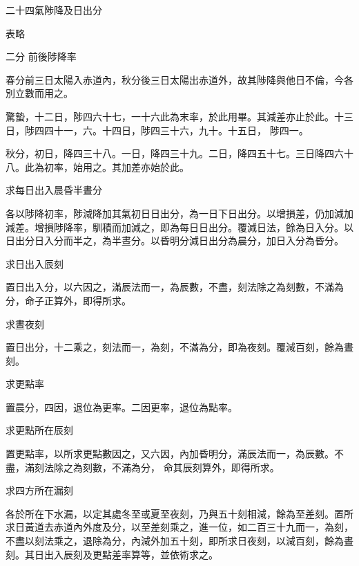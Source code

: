 \begin{pinyinscope}
 二十四氣陟降及日出分



 表略



 二分
 前後陟降率



 春分前三日太陽入赤道內，秋分後三日太陽出赤道外，故其陟降與他日不倫，今各別立數而用之。



 驚蟄，十二日，陟四六十七，一十六此為末率，於此用畢。其減差亦止於此。十三日，陟四四十一，六。十四日，陟四三十六，九十。十五日，
 陟四一。



 秋分，初日，降四三十八。一日，降四三十九。二日，降四五十七。三日降四六十八。此為初率，始用之。其加差亦始於此。



 求每日出入晨昏半晝分



 各以陟降初率，陟減降加其氣初日日出分，為一日下日出分。以增損差，仍加減加減差。增損陟降率，馴積而加減之，即為每日日出分。覆減日法，餘為日入分。以日出分日入分而半之，為半晝分。以昏明分減日出分為晨分，加日入分為昏分。



 求日出入辰刻



 置日出入分，以六因之，滿辰法而一，為辰數，不盡，刻法除之為刻數，不滿為分，命子正算外，即得所求。



 求晝夜刻



 置日出分，十二乘之，刻法而一，為刻，不滿為分，即為夜刻。覆減百刻，餘為晝刻。



 求更點率



 置晨分，四因，退位為更率。二因更率，退位為點率。



 求更點所在辰刻



 置更點率，以所求更點數因之，又六因，內加昏明分，滿辰法而一，為辰數。不盡，滿刻法除之為刻數，不滿為分，
 命其辰刻算外，即得所求。



 求四方所在漏刻



 各於所在下水漏，以定其處冬至或夏至夜刻，乃與五十刻相減，餘為至差刻。置所求日黃道去赤道內外度及分，以至差刻乘之，進一位，如二百三十九而一，為刻，不盡以刻法乘之，退除為分，內減外加五十刻，即所求日夜刻，以減百刻，餘為晝刻。其日出入辰刻及更點差率算等，並依術求之。




\end{pinyinscope}
